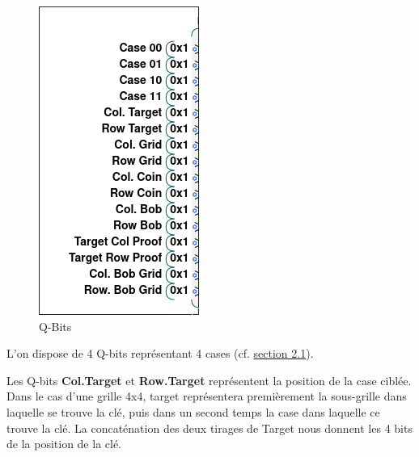 \documentclass[12pt]{article}
\begin{document}
    \begin{figure}
        \begin{center}
            \includegraphics[width=0.8\linewidth]{image.png}
            \caption{Q-Bits}
            \label{fig:enter-label}
        \end{center}
    \end{figure}
    L'on dispose de 4 Q-bits représentant 4 cases (cf. \hyperref[sec:grid-2x2]{section 2.1}).
    \vspace{5mm}
    
    Les Q-bits \textbf{Col.Target} et \textbf{Row.Target} représentent la position de la case ciblée. Dans le cas d'une grille 4x4, target représentera premièrement la sous-grille dans laquelle se trouve la clé, puis dans un second temps la case dans laquelle ce trouve la clé. La concaténation des deux tirages de Target nous donnent les 4 bits de la position de la clé.
    
\end{document}
